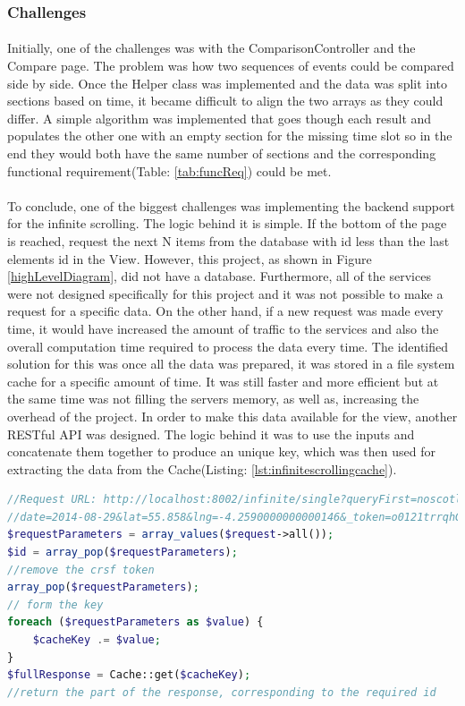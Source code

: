 \documentclass{l4proj}
\begin{document}
\subsubsection{Challenges}
\paragraph{}
Initially, one of the challenges was with the ComparisonController and the Compare page. The problem was how two sequences of events could be compared side by side. Once the Helper class was implemented and the data was split into sections based on time, it became difficult to align the two arrays as they could differ. A simple algorithm was implemented that goes though each result and populates the other one with an empty section for the missing time slot so in the end they would both have the same number of sections and the corresponding functional requirement(Table: \ref{tab:funcReq}) could be met. 

\paragraph{}
To conclude, one of the biggest challenges was implementing the backend support for the infinite scrolling. The logic behind it is simple. If the bottom of the page is reached, request the next N items from the database with id less than the last element\textquotesingle s id in the View. However, this project, as shown in Figure \ref{highLevelDiagram}, did not have a database. Furthermore, all of the services were not designed specifically for this project and it was not possible to make a request for a specific data. On the other hand, if a new request was made every time, it would have increased the amount of traffic to the services and also the overall computation time required to process the data every time. The identified solution for this was once all the data was prepared, it was stored in a file system cache for a specific amount of time. It was still faster and more efficient but at the same time was not filling the server\textquotesingle s memory, as well as, increasing the overhead of the project. In order to make this data available for the view, another RESTful API was designed. The logic behind it was to use the inputs and concatenate them together to produce an unique key, which was then used for extracting the data from the Cache(Listing: \ref{lst:infinitescrollingcache}).   

\begin{lstlisting}[caption={Using Cache for infinite scrolling},label={lst:infinitescrollingcache},language=PHP]
//Request URL: http://localhost:8002/infinite/single?queryFirst=noscotland&
//date=2014-08-29&lat=55.858&lng=-4.2590000000000146&_token=o0121trrqhGeBEv4F1fVqAcYLKinSJabgQ9GOjHQ&sectionID=03am
$requestParameters = array_values($request->all());
$id = array_pop($requestParameters);
//remove the crsf token 
array_pop($requestParameters);
// form the key
foreach ($requestParameters as $value) {
    $cacheKey .= $value;
}
$fullResponse = Cache::get($cacheKey);
//return the part of the response, corresponding to the required id 
\end{lstlisting}
\end{document}

